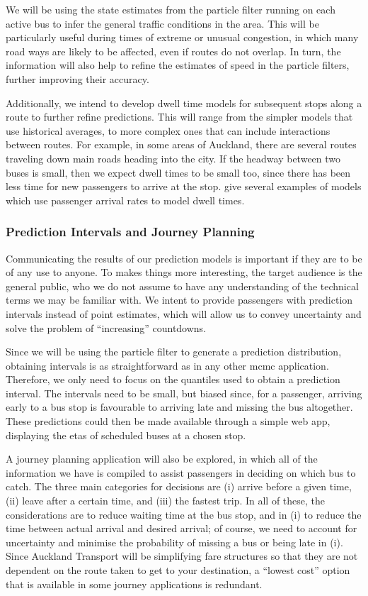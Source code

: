 \documentclass[12pt,a4paper]{article}
\newcommand{\pf}{particle filter}
\begin{document}
We will be using the state estimates from the \pf{} running on each active bus to infer
the general traffic conditions in the area.
This will be particularly useful during times of extreme or unusual congestion,
in which many road ways are likely to be affected,
even if routes do not overlap.
In turn, the information will also help to refine the estimates of speed in the \pf{}s,
further improving their accuracy.


Additionally, we intend to develop dwell time models for subsequent stops along a route
to further refine predictions.
This will range from the simpler models that use historical averages,
to more complex ones that can include interactions between routes.
For example, in some areas of Auckland,
there are several routes traveling down main roads heading into the city.
If the headway between two buses is small,
then we expect dwell times to be small too, since there has been less time for
new passengers to arrive at the stop.
\cite{hans-etal:2015} give several examples of models which use passenger
arrival rates to model dwell times.




\subsubsection*{Prediction Intervals and Journey Planning}

Communicating the results of our prediction models is important if they are to be of any use to anyone.
To makes things more interesting, the target audience is the general public,
who we do not assume to have any understanding of the technical terms we may be familiar with.
We intent to provide passengers with prediction intervals instead of point estimates,
which will allow us to convey uncertainty and 
solve the problem of ``increasing'' countdowns.


Since we will be using the particle filter to generate a prediction distribution,
obtaining intervals is as straightforward as in any other \gls{mcmc} application.
Therefore, we only need to focus on the quantiles used to obtain a prediction interval.
The intervals need to be small, 
but biased since, for a passenger, 
arriving early to a bus stop is favourable to arriving late and missing the bus altogether.
These predictions could then be made available through a simple web app,
displaying the \glspl{eta} of scheduled buses at a chosen stop.


A journey planning application will also be explored,
in which all of the information we have is compiled to assist passengers
in deciding on which bus to catch.
The three main categories for decisions are
(i) arrive before a given time, (ii) leave after a certain time,
and (iii) the fastest trip.
In all of these, the considerations are to reduce waiting time at the bus stop,
and in (i) to reduce the time between actual arrival and desired arrival;
of course, we need to account for uncertainty and minimise the probability of missing a bus
or being late in (i).
Since Auckland Transport will be simplifying fare structures so that they are not dependent 
on the route taken to get to your destination,
a ``lowest cost'' option that is available in some journey applications is redundant.
\end{document}
